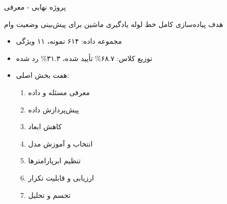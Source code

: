 \documentclass[aspectratio=169]{beamer}
\begin{document}
\begin{frame}{پروژه نهایی - معرفی}
\begin{block}{هدف}
پیاده‌سازی کامل خط لوله یادگیری ماشین برای پیش‌بینی وضعیت وام
\end{block}

\begin{itemize}
\item مجموعه داده: ۶۱۴ نمونه، ۱۱ ویژگی
\item توزیع کلاس: ۶۸.۷\% تأیید شده، ۳۱.۳\% رد شده
\item هفت بخش اصلی:
\begin{enumerate}
\item معرفی مسئله و داده
\item پیش‌پردازش داده
\item کاهش ابعاد
\item انتخاب و آموزش مدل
\item تنظیم ابرپارامترها
\item ارزیابی و قابلیت تکرار
\item تجسم و تحلیل
\end{enumerate}
\end{itemize}
\end{frame}
\end{document}
